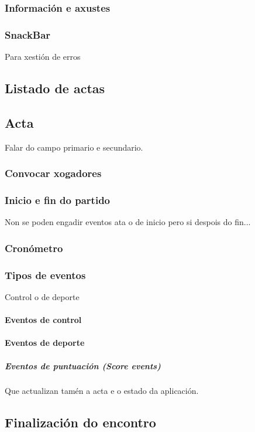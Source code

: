       \subsubsection{Información e axustes}

      \subsubsection{SnackBar}
      Para xestión de erros

    \subsection{Listado de actas}


    \subsection{Acta}
      Falar do campo primario e secundario.

      \subsubsection{Convocar xogadores}

      \subsubsection{Inicio e fin do partido}
      Non se poden engadir eventos ata o de inicio pero si despois do fin...

      \subsubsection{Cronómetro}

      \subsubsection{Tipos de eventos}
    Control o de deporte
      \paragraph{Eventos de control}
      \paragraph{Eventos de deporte}
        \subparagraph{Eventos de puntuación (Score events)}
        Que actualizan tamén a acta e o estado da aplicación.

    \subsection{Finalización do encontro}

